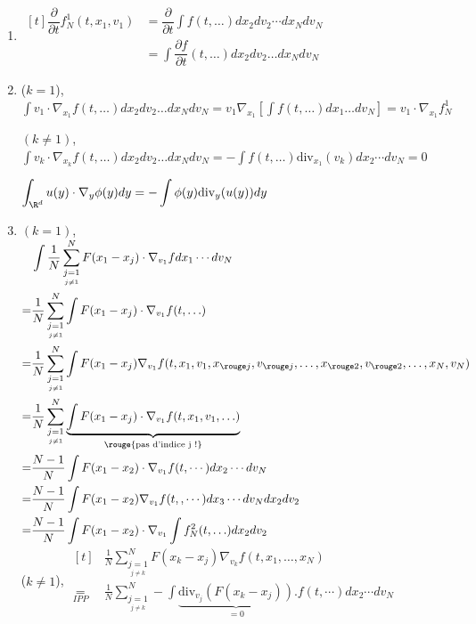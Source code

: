 \documentclass[12pt,a4paper]{article}
\begin{document}
	\begin{enumerate}
		\item[$(1)$] $\begin{aligned}[t]
			\dfrac{\partial}{\partial t} f_N^1(t,x_1,v_1) 
			&= \dfrac{\partial}{\partial t} \int f(t,\ldots) dx_2dv_2 \cdots dx_N dv_N\\
			&= \int \dfrac{\partial f}{\partial t}(t,\ldots) dx_2 dv_2 \ldots dx_N dv_N
		\end{aligned}$
		
		\item[$(2)$] ($k=1$), $\displaystyle\int v_1 \cdot \nabla_{x_1} f(t,\ldots) dx_2 dv_2 \ldots dx_N dv_N = v_1 \nabla_{x_1}\left[\int f(t,\ldots)dx_1\ldots dv_N\right] = v_1 \cdot \nabla_{x_1} f_N^1$
		
		\hspace{-.6cm}$(k \not= 1)$, $\displaystyle\int v_k \cdot \nabla_{x_k} f(t,\ldots) dx_2dv_2 \ldots dx_N dv_N = -\int f(t,\ldots)\text{div}_{x_1}(v_k) dx_2 \cdots dv_N = 0$
		
		 $\displaystyle \int_{\R^d} u(y) \cdot \nabla_y \phi(y) dy = - \int \phi(y)\text{div}_y(u(y)) dy$\\
		
		\item[$(3)$] $(k=1)$, $\begin{aligned}[t]
			&\displaystyle\int \frac{1}{N} \sum_{\underset{j\not=1}{j=1}}^N F(x_1-x_j)\cdot \nabla_{v_1} f dx_1 \cdots dv_N\\
			=
			&\frac{1}{N} \displaystyle\sum_{\underset{j\not=1}{j=1}}^N \int F(x_1-x_j) \cdot \nabla_{v_1} f(t,\ldots)\\
			=
			&\frac{1}{N}\displaystyle\sum_{\underset{j\not=1}{j=1}}^N\int F(x_1-x_j)\nabla_{v_1}f(t,x_1,v_1,x_{\rouge j},v_{\rouge j},\dots,x_{\rouge2},v_{\rouge2},\ldots,x_N,v_N) \\
			=
			&\frac{1}{N}\displaystyle\sum_{\underset{j\not= 1}{j=1}}^N\underbrace{\int F(x_1-x_j)\cdot \nabla_{v_1}f(t,x_1,v_1,\ldots)}_{\text{\rouge{pas d'indice j !}}}\\
			=
			& \frac{N-1}{N} \int F(x_1-x_2) \cdot \nabla_{v_1}f(t,\cdots) dx_2 \cdots dv_N\\
			=
			& \frac{N-1}{N} \int F(x_1-x_2)\nabla_{v_1} f(t,,\cdots) dx_3\cdots dv_N dx_2 dv_2\\
			=
			& \frac{N-1}{N} \int F(x_1-x_2) \cdot \nabla_{v_1} \int f_N^2(t,\ldots) dx_2 dv_2
		\end{aligned}$\\
		
		($k\not = 1$), $\begin{aligned}[t]
			&\displaystyle\frac{1}{N}  \sum_{\underset{j\not=k}{j=1}}^NF(x_k-x_j)\nabla_{v_k}f(t,x_1,\ldots,x_N)\\
			\underset{IPP}{=}
			& \frac{1}{N} \sum_{\underset{j\not= k}{j=1}}^N -\int \underbrace{\text{div}_{v_j}(F(x_k-x_j))}_{=0}.f(t,\cdots) dx_2 \cdots dv_N
		\end{aligned}$		
	\end{enumerate}
	
\end{document}

